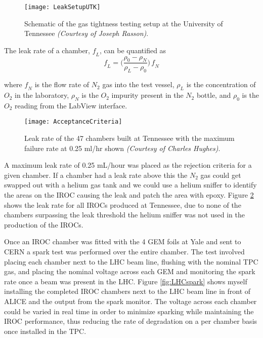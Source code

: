 \begin{figure}[h]
\texttt{[image: LeakSetupUTK]}
\centering
\caption{Schematic of the gas tightness testing setup at the University of Tennessee \textit{(Courtesy of Joseph Rasson)}. }
\label{fig:LeakTest}
\end{figure}

\noindent 
The leak rate of a chamber, $\mathit{f_{L}}$,  can be quantified as
\begin{equation}
\mathit{f_{L}} =\Bigg(  \frac{\rho_{0} -\rho_{N}}{\rho_{L} -\rho_{0}} \Bigg) \,  \mathit{f_{N}}
\label{eq:leakrate}
\end{equation}

\noindent
where $\mathit{f_{N}}$ is the flow rate of $N_{2}$ gas into the test vessel, $\rho_{L}$ is the concentration of $O_{2}$ in the laboratory, $\rho_{N}$ is the $O_{2}$ impurity present in the $N_{2}$ bottle, and $\rho_{0}$ is the $O_{2}$ reading from the LabView interface.  

\begin{figure}[h]
\texttt{[image: AcceptanceCriteria]}
\centering
\caption{Leak rate of the 47 chambers built at Tennessee with the maximum failure rate at 0.25 ml/hr shown \textit{(Courtesy of Charles Hughes)}. }
\label{fig:IROCprod}
\end{figure}


A maximum leak rate of 0.25 mL/hour was placed as the rejection criteria for a given chamber.  If a chamber had a leak rate above this the $N_{2}$ gas could get swapped out with a helium gas tank and we could use a helium sniffer to identify the areas on the IROC causing the leak and patch the area with epoxy.  Figure \ref{fig:IROCprod} shows the leak rate for all IROCs produced at Tennessee, due to none of the chambers surpassing the leak threshold the helium sniffer was not used in the production of the IROCs. 

Once an IROC chamber was fitted with the 4 GEM foils at Yale and sent to CERN a spark test was performed over the entire chamber.  The test involved placing each chamber next to the LHC beam line, flushing with the nominal TPC gas, and placing the nominal voltage across each GEM and monitoring the spark rate once a beam was present in the LHC.   Figure \ref{fig:LHCspark} shows myself installing the completed IROC chambers next to the LHC beam line in front of ALICE and the output from the spark monitor.  The voltage across each chamber could be varied in real time in order to minimize sparking while maintaining the IROC performance, thus reducing the rate of degradation on a per chamber basis once installed in the TPC.




